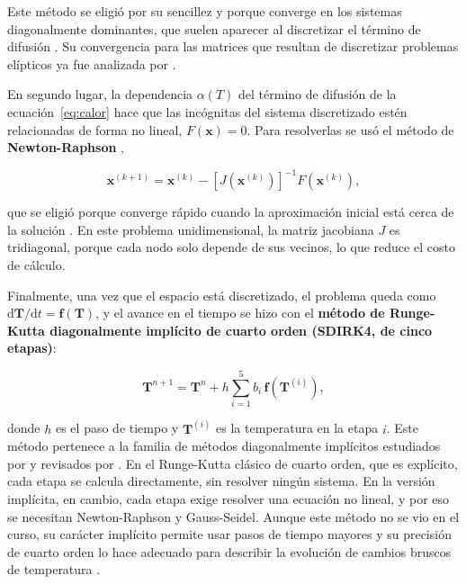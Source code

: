 \documentclass[final,5p,times,twocolumn,authoryear,11pt]{elsarticle}
\begin{document}
\noindent Este método se eligió por su sencillez y porque converge en los sistemas diagonalmente dominantes, que suelen aparecer al discretizar el término de difusión \citep{Zhang2015}. Su convergencia para las matrices que resultan de discretizar problemas elípticos ya fue analizada por \citet{Young1954}.

En segundo lugar, la dependencia $\alpha(T)$ del término de difusión de la ecuación~\eqref{eq:calor} hace que las incógnitas del sistema discretizado estén relacionadas de forma no lineal, $F(\mathbf{x}) = 0$. Para resolverlas se usó el método de \textbf{Newton-Raphson} \citep{Ypma1995},

\begin{equation}
\mathbf{x}^{(k+1)} = \mathbf{x}^{(k)} - \left[ J\!\left(\mathbf{x}^{(k)}\right) \right]^{-1} F\!\left(\mathbf{x}^{(k)}\right),
\label{eq:newton_raphson}
\end{equation}

\noindent que se eligió porque converge rápido cuando la aproximación inicial está cerca de la solución \citep{Deuflhard1974}. En este problema unidimensional, la matriz jacobiana $J$ es tridiagonal, porque cada nodo solo depende de sus vecinos, lo que reduce el costo de cálculo.

Finalmente, una vez que el espacio está discretizado, el problema queda como $\mathrm{d}\mathbf{T}/\mathrm{d}t=\mathbf{f}(\mathbf{T})$, y el avance en el tiempo se hizo con el \textbf{método de Runge-Kutta diagonalmente implícito de cuarto orden (SDIRK4, de cinco etapas)}:

\begin{equation}
\mathbf{T}^{n+1} = \mathbf{T}^{n} + h\sum_{i=1}^{5} b_i\,\mathbf{f}(\mathbf{T}^{(i)}),
\label{eq:sdirk}
\end{equation}

\noindent donde $h$ es el paso de tiempo y $\mathbf{T}^{(i)}$ es la temperatura en la etapa $i$. Este método pertenece a la familia de métodos diagonalmente implícitos estudiados por \citet{Alexander1977} y revisados por \citet{Kennedy2003}. En el Runge-Kutta clásico de cuarto orden, que es explícito, cada etapa se calcula directamente, sin resolver ningún sistema. En la versión implícita, en cambio, cada etapa exige resolver una ecuación no lineal, y por eso se necesitan Newton-Raphson y Gauss-Seidel. Aunque este método no se vio en el curso, su carácter implícito permite usar pasos de tiempo mayores y su precisión de cuarto orden lo hace adecuado para describir la evolución de cambios bruscos de temperatura \citep{Deng2015, Deng2014, Levy2022}.
\end{document}
